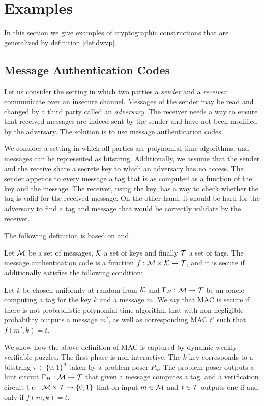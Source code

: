 \documentclass[11pt,a4paper,titlepage]{memoir}
\begin{document}
\section{Examples}
\label{section:wvp_examples}
In this section we give examples of cryptographic constructions that are generalized by definition \ref{def:dwvp}.

\subsection{Message Authentication Codes}
Let us consider the setting in which two parties a \textit{sender} and a \textit{receiver} communicate over an insecure channel.
Messages of the sender may be read and changed by a third party called an \textit{adversary}.
The receiver needs a way to ensure that received messages are indeed sent by the sender and have not been modified by the adversary.
The solution is to use message authentication codes.

We consider a setting in which all parties are polynomial time algorithms, and messages can be represented as bitstring.
Additionally, we assume that the sender and the receive share a secrete key to which an adversary has no access.
The sender appends to every message a tag that is as computed as a function of the key and the message.
The receiver, using the key, has a way to check whether the tag is valid for the received message.
On the other hand, it should be hard for the adversary to find a tag and message that would be correctly validate by the receiver.

The following definition is based on \cite{LectureNotesCrypo} and \cite{Goldreich:2004:FCV:975541}.
\begin{definition}
  Let $\mathcal{M}$ be a set of messages, $\mathcal{K}$ a set of keys and finally $\mathcal{T}$ a set of tags.
  The message authentication code is a function $f:\mathcal{M} \times \mathcal{K} \rightarrow \mathcal{T}$, and it is secure if additionally satisfies the following condition:

  Let $k$ be chosen uniformly at random from $\mathcal{K}$ and $\Gamma_H: \mathcal{M} \rightarrow \mathcal{T}$ be an oracle computing
  a tag for the key $k$ and a message $m$. We say that MAC is secure if there is not probabilistic polynomial time algorithm
  that with non-negligible probability outputs a message $m'$, as well as corresponding MAC $t'$ such that $f(m', k) = t$.
\end{definition}

We show how the above definition of MAC is captured by dynamic weakly verifiable puzzles.
The first phase is non interactive.
The $k$ key corresponds to a bitstring $\pi \in \{0,1\}^{n}$ taken by a problem poser $P_n$.
The problem poser outputs a hint circuit $\Gamma_H: \mathcal{M} \rightarrow \mathcal{T}$ that given a message computes a tag.
and a verification circuit $\Gamma_V: \mathcal{M} \times \mathcal{T} \rightarrow \{0,1\}$ that on input $m \in \mathcal{M}$ and $t \in \mathcal{T}$
outputs one if and only if $f(m, k) = t$.
\end{document}
